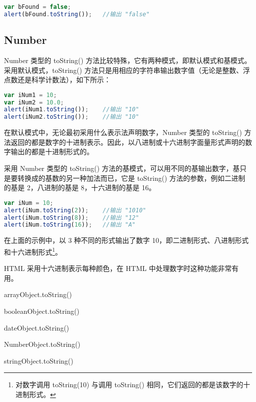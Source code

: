 \begin{lstlisting}[language=JavaScript]
var bFound = false;
alert(bFound.toString());	//输出 "false"
\end{lstlisting}




\subsection{Number}

Number 类型的 toString() 方法比较特殊，它有两种模式，即默认模式和基模式。采用默认模式，toString() 方法只是用相应的字符串输出数字值（无论是整数、浮点数还是科学计数法），如下所示：


\begin{lstlisting}[language=JavaScript]
var iNum1 = 10;
var iNum2 = 10.0;
alert(iNum1.toString());	//输出 "10"
alert(iNum2.toString());	//输出 "10"
\end{lstlisting}



在默认模式中，无论最初采用什么表示法声明数字，Number 类型的 toString() 方法返回的都是数字的十进制表示。因此，以八进制或十六进制字面量形式声明的数字输出的都是十进制形式的。


采用 Number 类型的 toString() 方法的基模式，可以用不同的基输出数字，基只是要转换成的基数的另一种加法而已，它是 toString() 方法的参数，例如二进制的基是 2，八进制的基是 8，十六进制的基是 16。



\begin{lstlisting}[language=JavaScript]
var iNum = 10;
alert(iNum.toString(2));	//输出 "1010"
alert(iNum.toString(8));	//输出 "12"
alert(iNum.toString(16));	//输出 "A"
\end{lstlisting}


在上面的示例中，以 3 种不同的形式输出了数字 10，即二进制形式、八进制形式和十六进制形式\footnote{对数字调用 toString(10) 与调用 toString() 相同，它们返回的都是该数字的十进制形式。}。

HTML 采用十六进制表示每种颜色，在 HTML 中处理数字时这种功能非常有用。


\begin{compactitem}
\item arrayObject.toString()
\item booleanObject.toString()
\item dateObject.toString()
\item NumberObject.toString()
\item stringObject.toString()
\end{compactitem}



